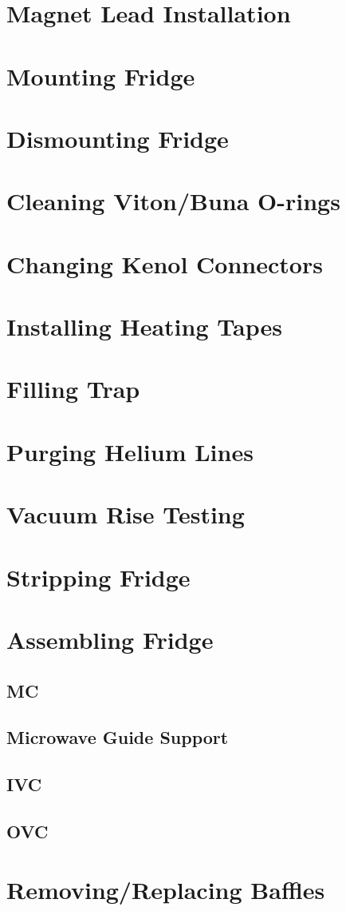 \section{Magnet Lead Installation}

\section{Mounting Fridge}

\section{Dismounting Fridge}

\section{Cleaning Viton/Buna O-rings}

\section{Changing Kenol Connectors}

\section{Installing Heating Tapes}

\section{Filling \lnn{} Trap}

\section{Purging Helium Lines}

\section{Vacuum Rise Testing}

\section{Stripping Fridge}

\section{Assembling Fridge}

  \subsection{MC}
  \subsection{Microwave Guide Support}
  \subsection{IVC}
  \subsection{OVC}

\section{Removing/Replacing \het{} Baffles}